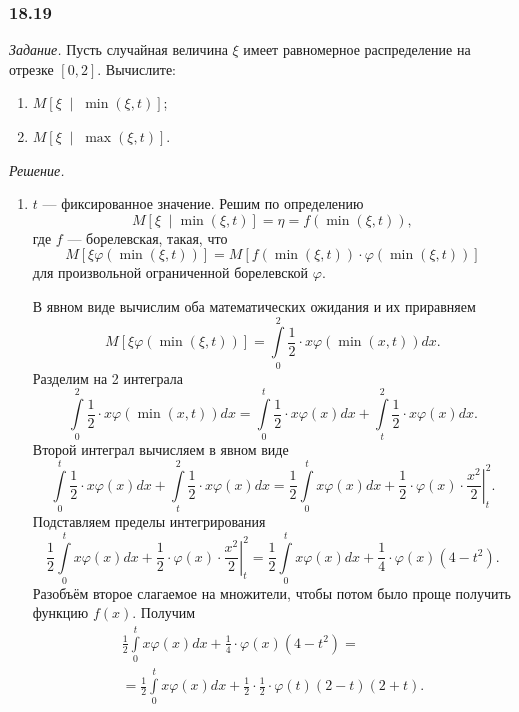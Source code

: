 \subsubsection*{18.19}

\textit{Задание.}
Пусть случайная величина $ \xi $ имеет равномерное распределение на отрезке $ \left[ 0, 2 \right] $.
Вычислите:
\begin{enumerate}[label=\alph*)]
  \item $M \left[ \xi \; \middle| \; \min \left( \xi, t \right) \right] $;
  \item $M \left[ \xi \; \middle| \; \max \left( \xi, t \right) \right] $.
\end{enumerate}

\textit{Решение.}
\begin{enumerate}[label=\alph*)]
  \item $t$ --- фиксированное значение.
  Решим по определению
  $$M \left[ \xi \; \middle| \min \left( \xi, t \right) \right] =
    \eta =
    f \left( \min \left( \xi, t \right) \right),$$
  где $f$ --- борелевская, такая,
  что
  $$M \left[ \xi \varphi \left( \min \left( \xi, t \right) \right) \right] =
    M \left[
      f \left( \min \left( \xi, t \right) \right) \cdot
      \varphi \left( \min \left( \xi, t \right) \right)
    \right] $$
  для произвольной ограниченной борелевской $ \varphi $.

  В явном виде вычислим оба математических ожидания и их приравняем
  $$M \left[ \xi \varphi \left( \min \left( \xi, t \right) \right) \right] =
    \int \limits_0^2 \frac{1}{2} \cdot x \varphi \left( \min \left( x, t \right) \right) dx.$$
  Разделим на 2 интеграла
  $$ \int \limits_0^2 \frac{1}{2} \cdot x \varphi \left( \min \left( x, t \right) \right) dx =
    \int \limits_0^t \frac{1}{2} \cdot x  \varphi \left( x \right) dx +
    \int \limits_t^2 \frac{1}{2} \cdot x \varphi \left( x \right) dx.$$
  Второй интеграл вычисляем в явном виде
  $$ \int \limits_0^t \frac{1}{2} \cdot x  \varphi \left( x \right) dx +
    \int \limits_t^2 \frac{1}{2} \cdot x \varphi \left( x \right) dx =
    \frac{1}{2} \int \limits_0^t x \varphi \left( x \right) dx +
    \left. \frac{1}{2} \cdot \varphi \left( x \right) \cdot \frac{x^2}{2} \right|_t^2.$$
  Подставляем пределы интегрирования
  $$ \frac{1}{2} \int \limits_0^t x \varphi \left( x \right) dx +
    \left. \frac{1}{2} \cdot \varphi \left( x \right) \cdot \frac{x^2}{2} \right|_t^2 =
    \frac{1}{2} \int \limits_0^t x \varphi \left( x \right) dx +
    \frac{1}{4} \cdot \varphi \left( x \right) \left( 4 - t^2 \right).$$
  Разобъём второе слагаемое на множители,
  чтобы потом было проще получить функцию $f \left( x \right) $.
  Получим
  \begin{equation*}
    \begin{split}
      \frac{1}{2} \int \limits_0^t x \varphi \left( x \right) dx +
      \frac{1}{4} \cdot \varphi \left( x \right) \left( 4 - t^2 \right) = \\
      = \frac{1}{2} \int \limits_0^t x \varphi \left( x \right) dx +
      \frac{1}{2} \cdot \frac{1}{2} \cdot
      \varphi \left( t \right) \left( 2 - t \right) \left( 2 + t \right).
    \end{split}
  \end{equation*}


\end{enumerate}
